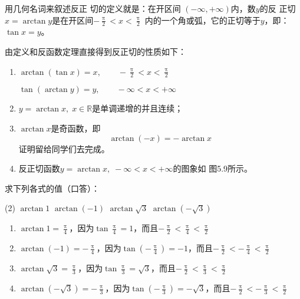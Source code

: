 用几何名词来叙述反正
切的定义就是：在开区间
$(-\infty, +\infty)$内，数$y$的反
正切$x=\arctan y$是在开区间$-\frac{\uppi}{2}<x<\frac{\uppi}{2}$
内的一个角或弧，它的正切等于$y$，即：$\tan x=y$。

由定义和反函数定理直接得到反正切的性质如下：
\begin{enumerate}
    \item $\arctan (\tan x)=x, \qquad -\frac{\uppi}{2}<x<\frac{\uppi}{2}$
    
    $\tan (\arctan y)=y,\qquad -\infty<x<+\infty$
    \item $y=\arctan x,\; x\in\mathbb{R}$是单调递增的并且连续；
    \item $\arctan x$是奇函数，即
    \[\arctan (-x)=-\arctan x\]
    证明留给同学们去完成。
    \item 反正切函数$y=\arctan x,\; -\infty<x<+\infty$的图象如
    图5.9所示。
\end{enumerate}

\begin{figure}[htp]
    \centering
{}
    \caption{}
\end{figure}



\begin{example}
    求下列各式的值（口答）：
\begin{tasks}(2)
    \task $\arctan 1$
    \task $\arctan (-1)$
    \task $\arctan \sqrt{3}$
    \task $\arctan (-\sqrt{3})$
\end{tasks}
\end{example}

\begin{solution}
\begin{enumerate}
    \item $\arctan 1=\frac{\uppi}{4}$，因为$\tan\frac{\uppi}{4}=1$，而且$-\frac{\uppi}{2}<\frac{\uppi}{4}<\frac{\uppi}{2}$
    \item $\arctan (-1)=-\frac{\uppi}{4}$，因为$\tan\left(-\frac{\uppi}{4}\right)=-1$，而且$-\frac{\uppi}{2}<-\frac{\uppi}{4}<\frac{\uppi}{2}$
    \item $\arctan \sqrt{3}=\frac{\uppi}{3}$，因为$\tan\frac{\uppi}{3}=\sqrt{3}$，而且$-\frac{\uppi}{2}<\frac{\uppi}{3}<\frac{\uppi}{2}$
    \item $\arctan (-\sqrt{3})=-\frac{\uppi}{3}$，因为$\tan\left(-\frac{\uppi}{3}\right)=-\sqrt{3}$，而且$-\frac{\uppi}{2}<-\frac{\uppi}{3}<\frac{\uppi}{2}$
\end{enumerate}
\end{solution}


